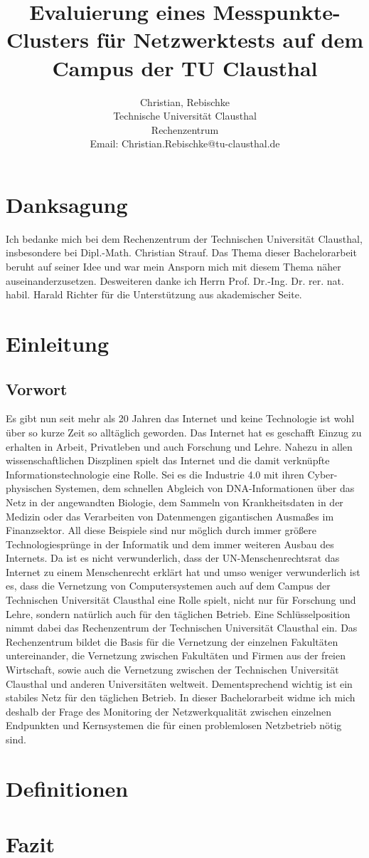 \documentclass[titlepage]{report}
\title{Evaluierung eines Messpunkte-Clusters für Netzwerktests auf dem
Campus der TU Clausthal}
\author{Christian, Rebischke\\
Technische Universität Clausthal\\
Rechenzentrum\\
Email: Christian.Rebischke@tu-clausthal.de}
\begin{document}
\maketitle
\chapter*{Danksagung}
Ich bedanke mich bei dem Rechenzentrum der Technischen Universität
Clausthal, insbesondere bei Dipl.\hyp{}Math. Christian Strauf. Das Thema
dieser Bachelorarbeit beruht auf seiner Idee und war mein Ansporn mich
mit diesem Thema näher auseinanderzusetzen. Desweiteren danke ich Herrn
Prof. Dr.\hyp{}Ing. Dr. rer. nat. habil. Harald Richter für die Unterstützung
aus akademischer Seite.
\tableofcontents
\chapter*{Einleitung}
\section*{Vorwort}
Es gibt nun seit mehr als 20 Jahren das Internet und keine Technologie
ist wohl über so kurze Zeit so alltäglich geworden. Das Internet hat es
geschafft Einzug zu erhalten in Arbeit, Privatleben und auch Forschung
und Lehre. Nahezu in allen wissenschaftlichen Diszplinen spielt das
Internet und die damit verknüpfte Informationstechnologie eine Rolle.
Sei es die Industrie 4.0 mit ihren Cyber-physischen Systemen, dem
schnellen Abgleich von DNA-Informationen über das Netz in der
angewandten Biologie, dem Sammeln von Krankheitsdaten in der Medizin
oder das Verarbeiten von Datenmengen gigantischen Ausmaßes im
Finanzsektor. All diese Beispiele sind nur möglich durch immer größere
Technologiesprünge in der Informatik und dem immer weiteren Ausbau des
Internets. Da ist es nicht verwunderlich, dass der UN-Menschenrechtsrat das
Internet zu einem Menschenrecht\cite{UNHRC} erklärt hat und umso weniger
verwunderlich ist es, dass die Vernetzung von Computersystemen auch auf
dem Campus der Technischen Universität Clausthal eine Rolle spielt,
nicht nur für Forschung und Lehre, sondern natürlich auch für den
täglichen Betrieb. Eine Schlüsselposition nimmt dabei das Rechenzentrum
der Technischen Universität Clausthal ein. Das Rechenzentrum bildet die
Basis für die Vernetzung der einzelnen Fakultäten untereinander, die
Vernetzung zwischen Fakultäten und Firmen aus der freien Wirtschaft,
sowie auch die Vernetzung zwischen der Technischen Universität Clausthal
und anderen Universitäten weltweit. Dementsprechend wichtig ist ein
stabiles Netz für den täglichen Betrieb. In dieser Bachelorarbeit widme
ich mich deshalb der Frage des Monitoring der Netzwerkqualität zwischen
einzelnen Endpunkten und Kernsystemen die für einen problemlosen
Netzbetrieb nötig sind.
\chapter*{Definitionen}
\chapter*{Fazit}
\nocite{*}
\printbibliography{}
\listoffigures
\end{document}
